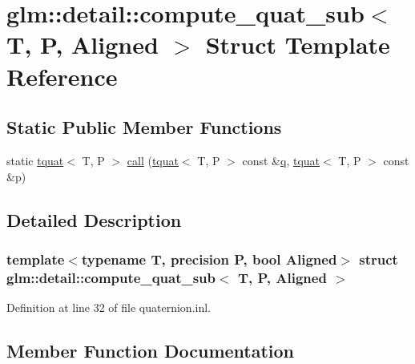 \hypertarget{structglm_1_1detail_1_1compute__quat__sub}{}\section{glm\+::detail\+::compute\+\_\+quat\+\_\+sub$<$ T, P, Aligned $>$ Struct Template Reference}
\label{structglm_1_1detail_1_1compute__quat__sub}
\subsection*{Static Public Member Functions}
\begin{DoxyCompactItemize}
\item 
static \mbox{\hyperlink{structglm_1_1tquat}{tquat}}$<$ T, P $>$ \mbox{\hyperlink{structglm_1_1detail_1_1compute__quat__sub_a712a8acc37b355da790e2542860ff459}{call}} (\mbox{\hyperlink{structglm_1_1tquat}{tquat}}$<$ T, P $>$ const \&\mbox{\hyperlink{glad_8h_a514729309336df22bcc8eda979d6ced4}{q}}, \mbox{\hyperlink{structglm_1_1tquat}{tquat}}$<$ T, P $>$ const \&p)
\end{DoxyCompactItemize}


\subsection{Detailed Description}
\subsubsection*{template$<$typename T, precision P, bool Aligned$>$\newline
struct glm\+::detail\+::compute\+\_\+quat\+\_\+sub$<$ T, P, Aligned $>$}



Definition at line 32 of file quaternion.\+inl.



\subsection{Member Function Documentation}
\mbox{\label{structglm_1_1detail_1_1compute__quat__sub_a712a8acc37b355da790e2542860ff459}} 
